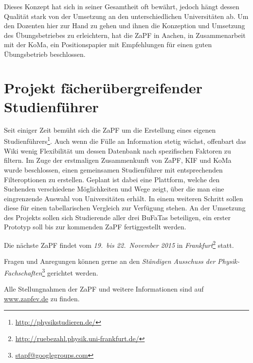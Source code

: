 \documentclass{scrartcl}
\begin{document}
Dieses Konzept hat sich in seiner Gesamtheit oft bewährt, jedoch hängt dessen Qualität stark von der Umsetzung an den unterschiedlichen Universitäten ab. Um den Dozenten hier zur Hand zu gehen und ihnen die Konzeption und
Umsetzung des Übungsbetriebes zu erleichtern, hat die ZaPF in Aachen, in
Zusammenarbeit mit der KoMa, ein Positionspapier mit Empfehlungen
für einen guten Übungsbetrieb beschlossen.

\section*{Projekt fächerübergreifender Studienführer }

Seit einiger Zeit bemüht sich die ZaPF um die Erstellung eines eigenen
Studienführers\footnote{\href{http://physikstudieren.de/}{\url{http://physikstudieren.de/}}}.
Auch wenn die Fülle an Information stetig wächst, offenbart das Wiki wenig
Flexibilität um dessen Datenbank nach spezifischen Faktoren zu filtern. Im
Zuge der erstmaligen Zusammenkunft von ZaPF, KIF und KoMa wurde beschlossen, einen gemeinsamen Studienführer mit entsprechenden
Filteroptionen zu erstellen. Geplant ist dabei eine Plattform, welche den
Suchenden verschiedene Möglichkeiten und Wege zeigt, über die man eine
eingrenzende Auswahl von Universitäten erhält. In einem weiteren Schritt sollen
diese für einen tabellarischen Vergleich zur Verfügung stehen.  An der
Umsetzung des Projekts sollen sich Studierende aller drei BuFaTas beteiligen, ein
erster Prototyp soll bis zur kommenden ZaPF fertiggestellt werden.


\vspace{0.5cm}
Die nächste ZaPF findet vom \emph{19.\ bis 22.\ November 2015} in \emph{Frankfurt}\footnote{\href{http://ruebezahl.physik.uni-frankfurt.de/}{\url{http://ruebezahl.physik.uni-frankfurt.de/}}} statt.

Fragen und Anregungen können gerne an den \emph{Ständigen Ausschuss der Physik-Fachschaften}\footnote{\href{mailto:stapf@googlegroups.com}{\url{stapf@googlegroups.com}}} gerichtet werden.

Alle Stellungnahmen der ZaPF und weitere Informationen sind auf \href{http://www.zapfev.de}{\url{www.zapfev.de}} zu finden.
\end{document}
